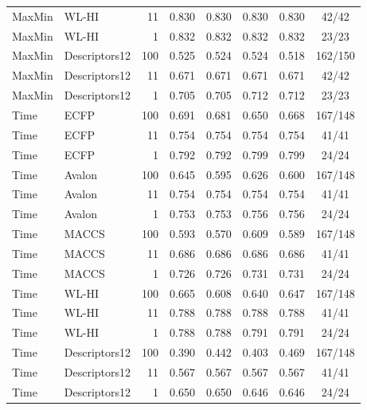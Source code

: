 \begin{longtable}{llrccccc}
MaxMin & WL-HI & 11 & 0.830 & 0.830 & 0.830 & 0.830 & 42/42 \\

MaxMin & WL-HI & 1 & 0.832 & 0.832 & 0.832 & 0.832 & 23/23 \\

MaxMin & Descriptors12 & 100 & 0.525 & 0.524 & 0.524 & 0.518 & 162/150 \\

MaxMin & Descriptors12 & 11 & 0.671 & 0.671 & 0.671 & 0.671 & 42/42 \\

MaxMin & Descriptors12 & 1 & 0.705 & 0.705 & 0.712 & 0.712 & 23/23 \\

Time & ECFP & 100 & 0.691 & 0.681 & 0.650 & 0.668 & 167/148 \\

Time & ECFP & 11 & 0.754 & 0.754 & 0.754 & 0.754 & 41/41 \\

Time & ECFP & 1 & 0.792 & 0.792 & 0.799 & 0.799 & 24/24 \\

Time & Avalon & 100 & 0.645 & 0.595 & 0.626 & 0.600 & 167/148 \\

Time & Avalon & 11 & 0.754 & 0.754 & 0.754 & 0.754 & 41/41 \\

Time & Avalon & 1 & 0.753 & 0.753 & 0.756 & 0.756 & 24/24 \\

Time & MACCS & 100 & 0.593 & 0.570 & 0.609 & 0.589 & 167/148 \\

Time & MACCS & 11 & 0.686 & 0.686 & 0.686 & 0.686 & 41/41 \\

Time & MACCS & 1 & 0.726 & 0.726 & 0.731 & 0.731 & 24/24 \\

Time & WL-HI & 100 & 0.665 & 0.608 & 0.640 & 0.647 & 167/148 \\

Time & WL-HI & 11 & 0.788 & 0.788 & 0.788 & 0.788 & 41/41 \\

Time & WL-HI & 1 & 0.788 & 0.788 & 0.791 & 0.791 & 24/24 \\

Time & Descriptors12 & 100 & 0.390 & 0.442 & 0.403 & 0.469 & 167/148 \\

Time & Descriptors12 & 11 & 0.567 & 0.567 & 0.567 & 0.567 & 41/41 \\

Time & Descriptors12 & 1 & 0.650 & 0.650 & 0.646 & 0.646 & 24/24 \\

\end{longtable}\endgroup

